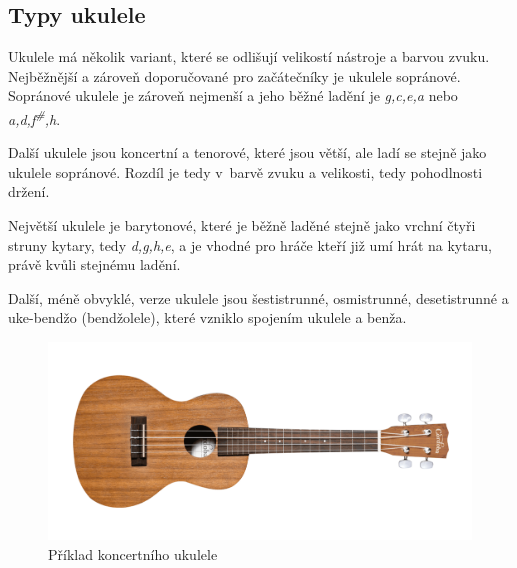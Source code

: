 \subsection{Typy ukulele}
Ukulele má několik variant, které se odlišují velikostí nástroje a barvou zvuku. Nejběžnější a zároveň doporučované pro začátečníky je ukulele sopránové. Sopránové ukulele je zároveň nejmenší a jeho běžné ladění je \textit{g,c,e,a} nebo \textit{a,d,f\textsuperscript{\#},h}.

Další ukulele jsou koncertní a tenorové, které jsou větší, ale ladí se stejně jako ukulele sopránové. Rozdíl je tedy v~barvě zvuku a velikosti, tedy pohodlnosti držení.

Největší ukulele je barytonové, které je běžně laděné stejně jako vrchní čtyři struny kytary, tedy \textit{d,g,h,e}, a je vhodné pro hráče kteří již umí hrát na kytaru, právě kvůli stejnému ladění.

Další, méně obvyklé, verze ukulele jsou šestistrunné, osmistrunné, desetistrunné a uke-bendžo (bendžolele), které vzniklo spojením ukulele a benža.

\begin{figure}
    \centering
    \includegraphics[width=\textwidth]{assets/ukulele.png}
    \caption[Příklad koncertního ukulele]{Příklad koncertního ukulele \cite{cordobaguitars_2020_ukulele}}
    \label{fig:ukulele_image}
\end{figure}